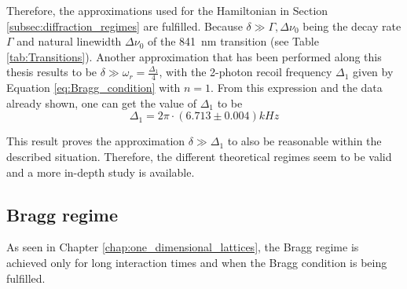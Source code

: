 Therefore, the approximations used for the Hamiltonian in Section \ref{subsec:diffraction_regimes} are fulfilled. Because $\delta \gg \Gamma, \Delta\nu_0$ being the decay rate $\Gamma$ and natural linewidth $\Delta\nu_0$ of the \SI{841}{\nano\meter} transition (see Table \ref{tab:Transitions}). Another approximation that has been performed along this thesis results to be $\delta \gg \omega_r = \frac{\Delta_1}{4}$, with the 2-photon recoil frequency $\Delta_1$ given by Equation \eqref{eq:Bragg_condition} with $n=1$. From this expression and the data already shown, one can get the value of $\Delta_1$ to be
\begin{equation}
	\Delta_1 = 2\pi \cdot (6.713 \pm 0.004)\si{kHz}
\end{equation}

This result proves the approximation $\delta \gg \Delta_1$ to also be reasonable within the described situation. Therefore, the different theoretical regimes seem to be valid and a more in-depth study is available.

\subsection{Bragg regime}

As seen in Chapter \ref{chap:one_dimensional_lattices}, the Bragg regime is achieved only for long interaction times and when the Bragg condition is being fulfilled.

